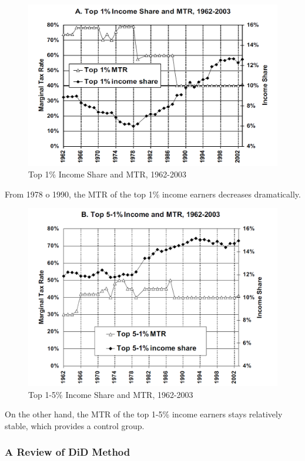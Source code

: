                 \begin{figure}[H]
                    \centering
                    \includegraphics[width=4.5in]{images/ch13/13_DID_1.png}
                    \caption{Top 1\% Income Share and MTR, 1962-2003}
                \end{figure}

                From 1978 o 1990, the MTR of the top 1\% income earners decreases dramatically.
                    
                \begin{figure}[H]
                    \centering
                    \includegraphics[width=4.5in]{images/ch13/13_DID_2.png}
                    \caption{Top 1-5\% Income Share and MTR, 1962-2003}
                \end{figure}

                On the other hand, the MTR of the top 1-5\% income earners stays relatively stable, which provides a control group.

            \subsubsection{A Review of DiD Method}

